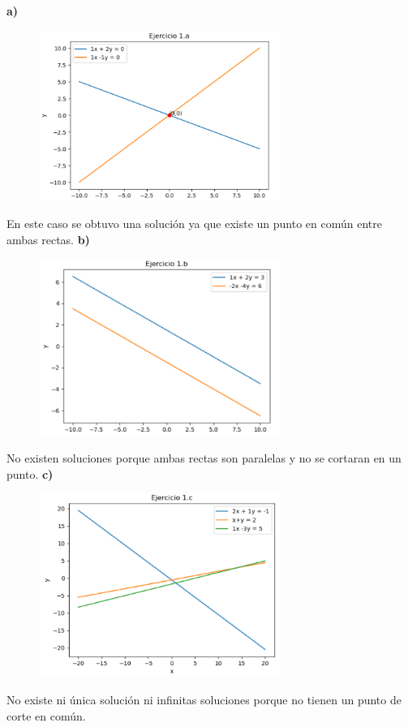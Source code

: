 \documentclass[12pt]{article}
\begin{document}
\textbf{a)}
\begin{figure}[H]
\centering
\includegraphics[width=0.7\textwidth]{./inFiles/Figures/Ej1a.png}
\end{figure}
En este caso se obtuvo una solución ya que existe un punto en común entre ambas rectas.
\textbf{b)}
\begin{figure}[H]
\centering
\includegraphics[width=0.7\textwidth]{./inFiles/Figures/Ej1b.png}
\end{figure}
No existen soluciones porque ambas rectas son paralelas y no se cortaran en un punto.
\newpage
\textbf{c)}
\begin{figure}[H]
\centering
\includegraphics[width=0.7\textwidth]{./inFiles/Figures/Ej1c.png}
\end{figure}
No existe ni única solución ni infinitas soluciones porque no tienen un punto de corte en común.
\end{document}

